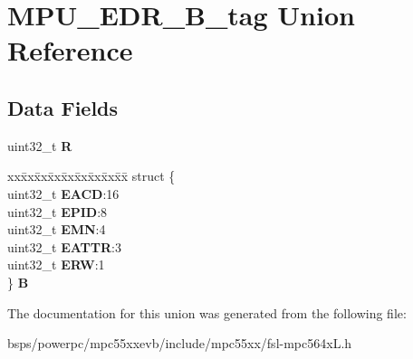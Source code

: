 \hypertarget{unionMPU__EDR__32B__tag}{}\section{M\+P\+U\+\_\+\+E\+D\+R\+\_\+B\+\_\+tag Union Reference}
\label{unionMPU__EDR__32B__tag}
\subsection*{Data Fields}
\begin{DoxyCompactItemize}
\item 
\mbox{\label{unionMPU__EDR__32B__tag_a6abe66fab0bb2a2e3a5f58d322062a5d}} 
uint32\+\_\+t {\bfseries R}
\item 
\mbox{\label{unionMPU__EDR__32B__tag_a3992841cd76214a3ed1090dfb4952b42}} 
\begin{tabbing}
xx\=xx\=xx\=xx\=xx\=xx\=xx\=xx\=xx\=\kill
struct \{\\
\>uint32\_t {\bfseries EACD}:16\\
\>uint32\_t {\bfseries EPID}:8\\
\>uint32\_t {\bfseries EMN}:4\\
\>uint32\_t {\bfseries EATTR}:3\\
\>uint32\_t {\bfseries ERW}:1\\
\} {\bfseries B}\\

\end{tabbing}\end{DoxyCompactItemize}


The documentation for this union was generated from the following file\+:\begin{DoxyCompactItemize}
\item 
bsps/powerpc/mpc55xxevb/include/mpc55xx/fsl-\/mpc564x\+L.\+h\end{DoxyCompactItemize}
